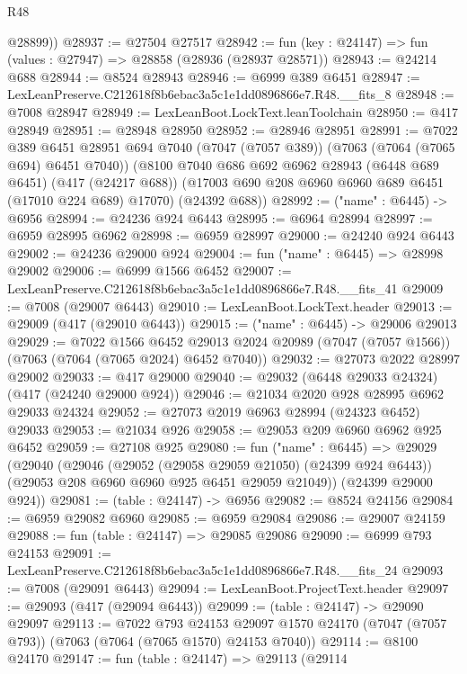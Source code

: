 \begin{lexlean}{R48}
\begin{coremodule}
        @28899))
@28937 := @27504 @27517
@28942 := fun (key : @24147) => fun (values : @27947) => @28858 (@28936 (@28937 @28571))
@28943 := @24214 @688
@28944 := @8524 @28943
@28946 := @6999 @389 @6451
@28947 := LexLeanPreserve.C212618f8b6ebac3a5c1e1dd0896866e7.R48.__fits_8
@28948 := @7008 @28947
@28949 := LexLeanBoot.LockText.leanToolchain
@28950 := @417 @28949
@28951 := @28948 @28950
@28952 := @28946 @28951
@28991 := @7022
    @389
    @6451
    @28951
    @694
    @7040
    (@7047 (@7057 @389))
    (@7063 (@7064 (@7065 @694) @6451 @7040))
    (@8100
      @7040
      @686
      @692
      @6962
      @28943
      (@6448 @689 @6451)
      (@417 (@24217 @688))
      (@17003 @690 @208 @6960 @6960 @689 @6451 (@17010 @224 @689) @17070)
      (@24392 @688))
@28992 := ("name" : @6445) -> @6956
@28994 := @24236 @924 @6443
@28995 := @6964 @28994
@28997 := @6959 @28995 @6962
@28998 := @6959 @28997
@29000 := @24240 @924 @6443
@29002 := @24236 @29000 @924
@29004 := fun ("name" : @6445) => @28998 @29002
@29006 := @6999 @1566 @6452
@29007 := LexLeanPreserve.C212618f8b6ebac3a5c1e1dd0896866e7.R48.__fits_41
@29009 := @7008 (@29007 @6443)
@29010 := LexLeanBoot.LockText.header
@29013 := @29009 (@417 (@29010 @6443))
@29015 := ("name" : @6445) -> @29006 @29013
@29029 := @7022
    @1566
    @6452
    @29013
    @2024
    @20989
    (@7047 (@7057 @1566))
    (@7063 (@7064 (@7065 @2024) @6452 @7040))
@29032 := @27073 @2022 @28997 @29002
@29033 := @417 @29000
@29040 := @29032 (@6448 @29033 @24324) (@417 (@24240 @29000 @924))
@29046 := @21034 @2020 @928 @28995 @6962 @29033 @24324
@29052 := @27073 @2019 @6963 @28994 (@24323 @6452) @29033
@29053 := @21034 @926
@29058 := @29053 @209 @6960 @6962 @925 @6452
@29059 := @27108 @925
@29080 := fun ("name" : @6445) =>
  @29029
    (@29040
      (@29046
        (@29052 (@29058 @29059 @21050) (@24399 @924 @6443))
        (@29053 @208 @6960 @6960 @925 @6451 @29059 @21049))
      (@24399 @29000 @924))
@29081 := (table : @24147) -> @6956
@29082 := @8524 @24156
@29084 := @6959 @29082 @6960
@29085 := @6959 @29084
@29086 := @29007 @24159
@29088 := fun (table : @24147) => @29085 @29086
@29090 := @6999 @793 @24153
@29091 := LexLeanPreserve.C212618f8b6ebac3a5c1e1dd0896866e7.R48.__fits_24
@29093 := @7008 (@29091 @6443)
@29094 := LexLeanBoot.ProjectText.header
@29097 := @29093 (@417 (@29094 @6443))
@29099 := (table : @24147) -> @29090 @29097
@29113 := @7022
    @793
    @24153
    @29097
    @1570
    @24170
    (@7047 (@7057 @793))
    (@7063 (@7064 (@7065 @1570) @24153 @7040))
@29114 := @8100 @24170
@29147 := fun (table : @24147) =>
  @29113
    (@29114

\end{coremodule}
\end{lexlean}
